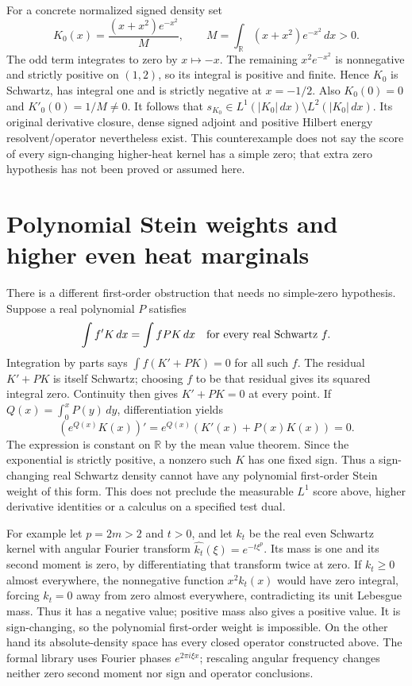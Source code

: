 \documentclass[11pt]{article}
\newcommand{\R}{\mathbb R}\newcommand{\C}{\mathbb C}
\begin{document}
For a concrete normalized signed density set
\[
 K_0(x)=\frac{(x+x^2)e^{-x^2}}{M},\qquad
 M=\int_\R(x+x^2)e^{-x^2}\,dx>0.
\]
The odd term integrates to zero by $x\mapsto-x$. The remaining
$x^2e^{-x^2}$ is nonnegative and strictly positive on $(1,2)$,
so its integral is positive and finite. Hence $K_0$ is Schwartz,
has integral one and is strictly negative at $x=-1/2$.
Also $K_0(0)=0$ and $K'_0(0)=1/M\ne0$. It follows that
$s_{K_0}\in L^1(|K_0|\,dx)\setminus L^2(|K_0|\,dx)$.
Its original derivative closure, dense signed adjoint and positive
Hilbert energy resolvent/operator nevertheless exist. This
counterexample does not say the score of every sign-changing
higher-heat kernel has a simple zero; that extra zero hypothesis
has not been proved or assumed here.

\section{Polynomial Stein weights and higher even heat marginals}
There is a different first-order obstruction that needs no
simple-zero hypothesis. Suppose a real polynomial $P$ satisfies
\[
 \int f'K\,dx=\int f P K\,dx
 \quad\hbox{for every real Schwartz }f.
\]
Integration by parts says $\int f(K'+PK)=0$ for all such $f$.
The residual $K'+PK$ is itself Schwartz; choosing $f$ to be
that residual gives its squared integral zero. Continuity then
gives $K'+PK=0$ at every point. If
$Q(x)=\int_0^xP(y)\,dy$, differentiation yields
\[
 (e^{Q(x)}K(x))'=e^{Q(x)}(K'(x)+P(x)K(x))=0.
\]
The expression is constant on $\R$ by the mean value theorem.
Since the exponential is strictly positive, a nonzero such $K$
has one fixed sign. Thus a sign-changing real Schwartz density
cannot have any polynomial first-order Stein weight of this form.
This does not preclude the measurable $L^1$ score above, higher
derivative identities or a calculus on a specified test dual.

For example let $p=2m>2$ and $t>0$, and let $k_t$ be the real
even Schwartz kernel with angular Fourier transform
$\widehat{k_t}(\xi)=e^{-t\xi^p}$. Its mass is one and its
second moment is zero, by differentiating that transform twice
at zero. If $k_t\geq0$ almost everywhere, the nonnegative
function $x^2k_t(x)$ would have zero integral, forcing $k_t=0$
away from zero almost everywhere, contradicting its unit
Lebesgue mass. Thus it has a negative value; positive mass also
gives a positive value. It is sign-changing, so the polynomial
first-order weight is impossible. On the other hand its
absolute-density space has every closed operator constructed
above. The formal library uses Fourier phases $e^{2\pi i\xi x}$;
rescaling angular frequency changes neither zero second moment
nor sign and operator conclusions.
\end{document}
